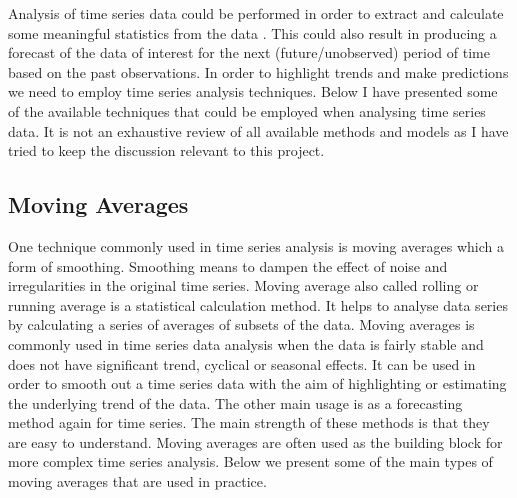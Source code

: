 Analysis of time series data could be performed in order to extract and calculate some meaningful statistics from the data \cite{shumway2010time}. This could also result in producing a forecast of the data of interest for the next (future/unobserved) period of time based on the past observations. In order to highlight trends and make predictions we need to employ time series analysis techniques. Below I have presented some of the available techniques that could be employed when analysing time series data. It is not an exhaustive review of all available methods and models as I have tried to keep the discussion relevant to this project.


\subsection{Moving Averages}
One technique commonly used in time series analysis is moving averages which a form of smoothing. Smoothing means to dampen the effect of noise and irregularities in the original time series. Moving average also called rolling or running average is a statistical calculation method.  It helps to analyse data series by calculating a series of averages of subsets of the data.  Moving averages is commonly used in time series data analysis when the data is fairly stable and does not have significant trend, cyclical or seasonal effects. It can be used in order to smooth out a time series data with the aim of highlighting or estimating the underlying trend of the data. The other main usage is as a forecasting method again for time series. The main strength of these methods is that they are easy to understand.  Moving averages are often used as the building block for more complex time series analysis. Below we present some of the main types of moving averages that are used in practice. \cite{brockwell2009time,shumway2010time}

